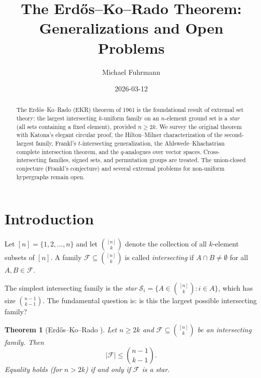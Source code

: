 \documentclass[12pt,a4paper]{amsart}
\newtheorem{theorem}{Theorem}[section]
\theoremstyle{definition}
\theoremstyle{remark}
\begin{document}
\begin{abstract}
The Erdős--Ko--Rado (EKR) theorem of 1961 is the foundational result of extremal
set theory: the largest intersecting $k$-uniform family on an $n$-element ground
set is a \emph{star} (all sets containing a fixed element), provided $n \geq 2k$.
We survey the original theorem with Katona's elegant circular proof, the
Hilton--Milner characterization of the second-largest family, Frankl's $t$-intersecting
generalization, the Ahlswede--Khachatrian complete intersection theorem, and the
$q$-analogues over vector spaces. Cross-intersecting families, signed sets, and
permutation groups are treated. The union-closed conjecture (Frankl's conjecture)
and several extremal problems for non-uniform hypergraphs remain open.
\end{abstract}

\title{The Erd\H{o}s--Ko--Rado Theorem:\\
Generalizations and Open Problems}

\author{Michael Fuhrmann}
\address{Specialist Mathematics Project, Build 164}
\date{2026-03-12}

\maketitle

\tableofcontents

\section{Introduction}

Let $[n] = \{1, 2, \ldots, n\}$ and let $\binom{[n]}{k}$ denote the collection of
all $k$-element subsets of $[n]$. A family $\mathcal{F} \subseteq \binom{[n]}{k}$
is called \emph{intersecting} if $A \cap B \neq \emptyset$ for all $A, B \in \mathcal{F}$.

The simplest intersecting family is the \emph{star}
$\mathcal{S}_i = \{A \in \binom{[n]}{k} : i \in A\}$,
which has size $\binom{n-1}{k-1}$. The fundamental question is: is this the largest
possible intersecting family?

\begin{theorem}[Erdős--Ko--Rado \cite{ErdosKoRado1961}]\label{thm:ekr}
Let $n \geq 2k$ and $\mathcal{F} \subseteq \binom{[n]}{k}$ be an intersecting family.
Then
\[
  |\mathcal{F}| \leq \binom{n-1}{k-1}.
\]
Equality holds (for $n > 2k$) if and only if $\mathcal{F}$ is a star.
\end{theorem}
\end{document}

